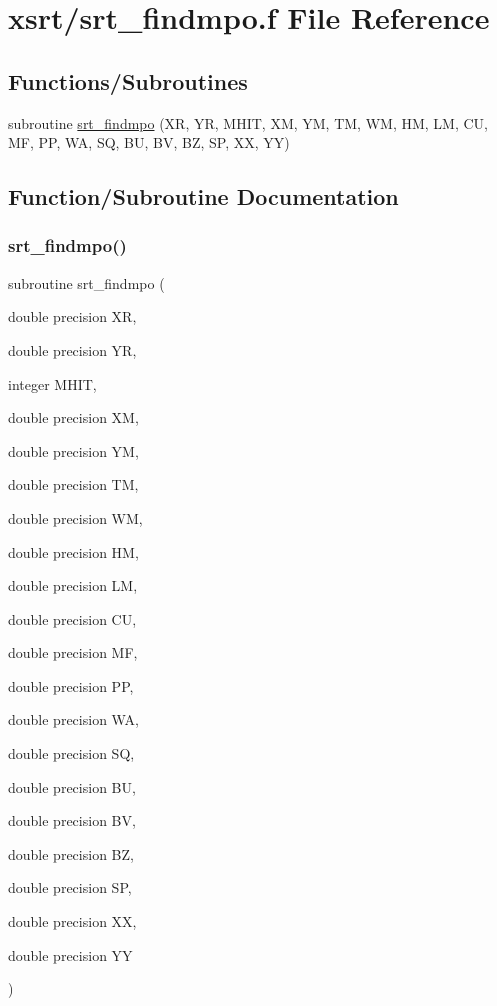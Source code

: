 \hypertarget{srt__findmpo_8f}{}\section{xsrt/srt\+\_\+findmpo.f File Reference}
\label{srt__findmpo_8f}
\subsection*{Functions/\+Subroutines}
\begin{DoxyCompactItemize}
\item 
subroutine \hyperlink{srt__findmpo_8f_aa8cc24c3b00c2e8010ee19fd98cbfa6d}{srt\+\_\+findmpo} (XR, YR, M\+H\+IT, XM, YM, TM, WM, HM, LM, CU, MF, PP, WA, SQ, BU, BV, BZ, SP, XX, YY)
\end{DoxyCompactItemize}


\subsection{Function/\+Subroutine Documentation}
\mbox{\label{srt__findmpo_8f_aa8cc24c3b00c2e8010ee19fd98cbfa6d}} 
\subsubsection{\texorpdfstring{srt\+\_\+findmpo()}{srt\_findmpo()}}
{\footnotesize\ttfamily subroutine srt\+\_\+findmpo (\begin{DoxyParamCaption}\item[{double precision}]{XR,  }\item[{double precision}]{YR,  }\item[{integer}]{M\+H\+IT,  }\item[{double precision}]{XM,  }\item[{double precision}]{YM,  }\item[{double precision}]{TM,  }\item[{double precision}]{WM,  }\item[{double precision}]{HM,  }\item[{double precision}]{LM,  }\item[{double precision}]{CU,  }\item[{double precision}]{MF,  }\item[{double precision}]{PP,  }\item[{double precision}]{WA,  }\item[{double precision}]{SQ,  }\item[{double precision}]{BU,  }\item[{double precision}]{BV,  }\item[{double precision}]{BZ,  }\item[{double precision}]{SP,  }\item[{double precision}]{XX,  }\item[{double precision}]{YY }\end{DoxyParamCaption})}

